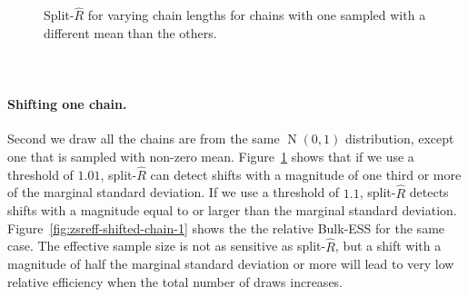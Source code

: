 \documentclass[american,]{article}
\let\oldparagraph\paragraph
\renewcommand{\paragraph}[1]{\oldparagraph{#1}\mbox{}}
\DeclareMathOperator{\N}{N}
\begin{document}
\begin{figure}[tp]
\begin{minipage}{0.48\textwidth}
  \caption{Split-\(\widehat{R}\) for varying chain lengths
    for chains with one sampled with a different mean than the others.\\~\\~}
  \label{fig:zsrhat-shifted-chain-1}
\end{minipage}
\end{figure}

\hypertarget{shifting-one-chain}{%
\paragraph{Shifting one chain.}\label{shifting-one-chain}}
Second  we draw all the chains are from the same $\N(0, 1)$ distribution,
except one that is sampled with non-zero
mean. Figure~\ref{fig:zsrhat-shifted-chain-1} shows that if we use a
threshold of \(1.01\), split-\(\widehat{R}\) can detect shifts with a
magnitude of one third or more of the marginal standard deviation. If
we use a threshold of \(1.1\), split-\(\widehat{R}\) detects shifts
with a magnitude equal to or larger than the marginal standard
deviation.
Figure~\ref{fig:zsreff-shifted-chain-1} shows the the relative
Bulk-ESS for the same case. The effective
sample size is not as sensitive as split-\(\widehat{R}\), but a shift
with a magnitude of half the marginal standard deviation or more will
lead to very low relative efficiency when the total number of draws
increases.
\end{document}
